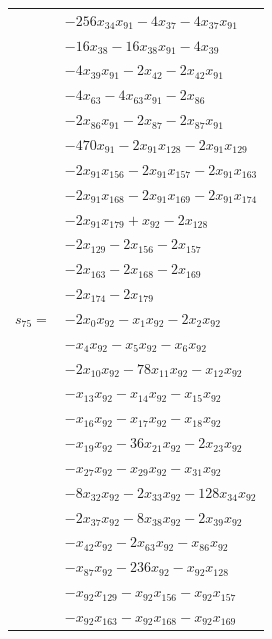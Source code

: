 \begin{longtable}{@{}r@{\;}l@{}}
 & \(\displaystyle -256x_{34}x_{91} -4x_{37} -4x_{37}x_{91}\) \\
 & \(\displaystyle -16x_{38} -16x_{38}x_{91} -4x_{39}\) \\
 & \(\displaystyle -4x_{39}x_{91} -2x_{42} -2x_{42}x_{91}\) \\
 & \(\displaystyle -4x_{63} -4x_{63}x_{91} -2x_{86}\) \\
 & \(\displaystyle -2x_{86}x_{91} -2x_{87} -2x_{87}x_{91}\) \\
 & \(\displaystyle -470x_{91} -2x_{91}x_{128} -2x_{91}x_{129}\) \\
 & \(\displaystyle -2x_{91}x_{156} -2x_{91}x_{157} -2x_{91}x_{163}\) \\
 & \(\displaystyle -2x_{91}x_{168} -2x_{91}x_{169} -2x_{91}x_{174}\) \\
 & \(\displaystyle -2x_{91}x_{179} +x_{92} -2x_{128}\) \\
 & \(\displaystyle -2x_{129} -2x_{156} -2x_{157}\) \\
 & \(\displaystyle -2x_{163} -2x_{168} -2x_{169}\) \\
 & \(\displaystyle -2x_{174} -2x_{179}\) \\[3pt]
\(s_{75}=\) & \(\displaystyle -2x_{0}x_{92} -x_{1}x_{92} -2x_{2}x_{92}\) \\
 & \(\displaystyle -x_{4}x_{92} -x_{5}x_{92} -x_{6}x_{92}\) \\
 & \(\displaystyle -2x_{10}x_{92} -78x_{11}x_{92} -x_{12}x_{92}\) \\
 & \(\displaystyle -x_{13}x_{92} -x_{14}x_{92} -x_{15}x_{92}\) \\
 & \(\displaystyle -x_{16}x_{92} -x_{17}x_{92} -x_{18}x_{92}\) \\
 & \(\displaystyle -x_{19}x_{92} -36x_{21}x_{92} -2x_{23}x_{92}\) \\
 & \(\displaystyle -x_{27}x_{92} -x_{29}x_{92} -x_{31}x_{92}\) \\
 & \(\displaystyle -8x_{32}x_{92} -2x_{33}x_{92} -128x_{34}x_{92}\) \\
 & \(\displaystyle -2x_{37}x_{92} -8x_{38}x_{92} -2x_{39}x_{92}\) \\
 & \(\displaystyle -x_{42}x_{92} -2x_{63}x_{92} -x_{86}x_{92}\) \\
 & \(\displaystyle -x_{87}x_{92} -236x_{92} -x_{92}x_{128}\) \\
 & \(\displaystyle -x_{92}x_{129} -x_{92}x_{156} -x_{92}x_{157}\) \\
 & \(\displaystyle -x_{92}x_{163} -x_{92}x_{168} -x_{92}x_{169}\) \\

\end{longtable}
